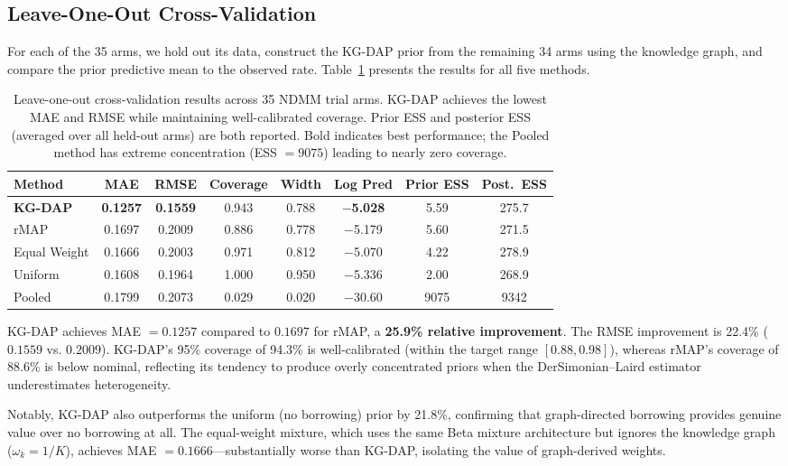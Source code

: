 \documentclass[12pt]{article}
\begin{document}
\subsection{Leave-One-Out Cross-Validation}
\label{sec:loocv}

For each of the 35 arms, we hold out its data, construct the KG-DAP prior from the remaining 34 arms using the knowledge graph, and compare the prior predictive mean to the observed rate. Table~\ref{tab:loocv} presents the results for all five methods.

\begin{table}[t]
\centering
\caption{Leave-one-out cross-validation results across 35 NDMM trial arms. KG-DAP achieves the lowest MAE and RMSE while maintaining well-calibrated coverage. Prior ESS and posterior ESS (averaged over all held-out arms) are both reported. Bold indicates best performance; the Pooled method has extreme concentration (ESS $= 9075$) leading to nearly zero coverage.}
\label{tab:loocv}
\begin{tabular}{lccccccc}
\toprule
Method & MAE & RMSE & Coverage & Width & Log Pred & Prior ESS & Post.\ ESS \\
\midrule
\textbf{KG-DAP}   & \textbf{0.1257} & \textbf{0.1559} & 0.943 & 0.788 & \textbf{$-$5.028} & 5.59 & 275.7 \\
rMAP               & 0.1697          & 0.2009          & 0.886 & 0.778 & $-$5.179          & 5.60 & 271.5 \\
Equal Weight       & 0.1666          & 0.2003          & 0.971 & 0.812 & $-$5.070          & 4.22 & 278.9 \\
Uniform            & 0.1608          & 0.1964          & 1.000 & 0.950 & $-$5.336          & 2.00 & 268.9 \\
Pooled             & 0.1799          & 0.2073          & 0.029 & 0.020 & $-$30.60          & 9075 & 9342 \\
\bottomrule
\end{tabular}
\end{table}

KG-DAP achieves MAE $= 0.1257$ compared to $0.1697$ for rMAP, a \textbf{25.9\% relative improvement}. The RMSE improvement is 22.4\% ($0.1559$ vs. $0.2009$). KG-DAP's 95\% coverage of 94.3\% is well-calibrated (within the target range $[0.88, 0.98]$), whereas rMAP's coverage of 88.6\% is below nominal, reflecting its tendency to produce overly concentrated priors when the DerSimonian--Laird estimator underestimates heterogeneity.

Notably, KG-DAP also outperforms the uniform (no borrowing) prior by 21.8\%, confirming that graph-directed borrowing provides genuine value over no borrowing at all. The equal-weight mixture, which uses the same Beta mixture architecture but ignores the knowledge graph ($\omega_k = 1/K$), achieves MAE $= 0.1666$---substantially worse than KG-DAP, isolating the value of graph-derived weights.
\end{document}
